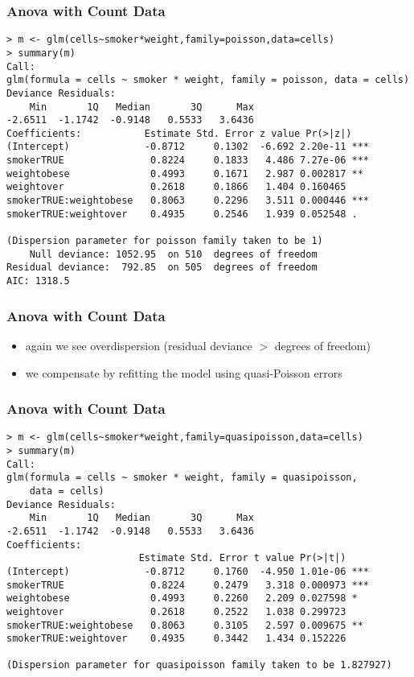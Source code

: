 \begin{frame}[fragile]\frametitle{Anova with Count Data}
\footnotesize
\begin{verbatim}
> m <- glm(cells~smoker*weight,family=poisson,data=cells)
> summary(m)
Call:
glm(formula = cells ~ smoker * weight, family = poisson, data = cells)
Deviance Residuals: 
    Min       1Q   Median       3Q      Max  
-2.6511  -1.1742  -0.9148   0.5533   3.6436  
Coefficients:           Estimate Std. Error z value Pr(>|z|)    
(Intercept)             -0.8712     0.1302  -6.692 2.20e-11 ***
smokerTRUE               0.8224     0.1833   4.486 7.27e-06 ***
weightobese              0.4993     0.1671   2.987 0.002817 ** 
weightover               0.2618     0.1866   1.404 0.160465    
smokerTRUE:weightobese   0.8063     0.2296   3.511 0.000446 ***
smokerTRUE:weightover    0.4935     0.2546   1.939 0.052548 .  

(Dispersion parameter for poisson family taken to be 1)
    Null deviance: 1052.95  on 510  degrees of freedom
Residual deviance:  792.85  on 505  degrees of freedom
AIC: 1318.5
\end{verbatim}
\end{frame}




\begin{frame}[fragile]\frametitle{Anova with Count Data}
  \begin{itemize}
  \item again we see overdispersion (residual deviance $>$ degrees of freedom)
  \item we compensate by refitting the model using quasi-Poisson errors
  \end{itemize}
\end{frame}


\begin{frame}[fragile]\frametitle{Anova with Count Data}
\footnotesize
\begin{verbatim}
> m <- glm(cells~smoker*weight,family=quasipoisson,data=cells)
> summary(m)
Call:
glm(formula = cells ~ smoker * weight, family = quasipoisson, 
    data = cells)
Deviance Residuals: 
    Min       1Q   Median       3Q      Max  
-2.6511  -1.1742  -0.9148   0.5533   3.6436  
Coefficients:
                       Estimate Std. Error t value Pr(>|t|)    
(Intercept)             -0.8712     0.1760  -4.950 1.01e-06 ***
smokerTRUE               0.8224     0.2479   3.318 0.000973 ***
weightobese              0.4993     0.2260   2.209 0.027598 *  
weightover               0.2618     0.2522   1.038 0.299723    
smokerTRUE:weightobese   0.8063     0.3105   2.597 0.009675 ** 
smokerTRUE:weightover    0.4935     0.3442   1.434 0.152226    

(Dispersion parameter for quasipoisson family taken to be 1.827927)
\end{verbatim}
\end{frame}

